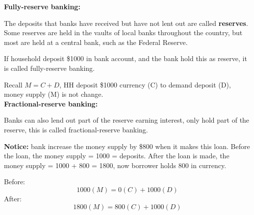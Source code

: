 \documentclass[12pt]{article}
\begin{document}
{\textbf {Fully-reserve banking:}}

The deposits that banks have received but have not lent out are called 
{\textbf {reserves}}.
Some reserves are held in the vaults of local banks throughout the country,
but most are held at a central bank, such as the Federal Reserve.

If household deposit \$1000 in bank account, and the bank hold this as reserve, it
is called fully-reserve banking.

\begin{figure}[H]
\end{figure}

Recall $ M = C + D $, HH deposit \$1000 currency (C) to demand deposit (D), money
supply (M) is not change.\\




{\textbf {Fractional-reserve banking:}}

Banks can also lend out part of the reserve earning interest, only hold part of the 
reserve, this is called fractional-reserve banking.


\begin{figure}[H]
\end{figure}

{\textbf {Notice:}} bank increase the money supply by \$800 when it makes this loan.
Before the loan, the money supply = 1000 = deposits. After the loan is made, 
the money supply = 1000 + 800 = 1800, now borrower holds 800 in currency.

Before:
\begin{equation*}
		1000(M) = 0(C) + 1000(D)
\end{equation*}
After:
\begin{equation*}
		1800(M) = 800(C) + 1000(D)
\end{equation*}
\end{document}
